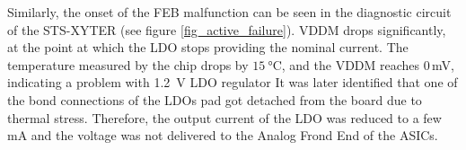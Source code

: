 Similarly, the onset of the \gls{FEB} malfunction can be seen in the diagnostic circuit of the STS-XYTER (see figure \ref{fig_active_failure}). VDDM drops significantly, at the point at which the \gls{LDO} stops providing the nominal current. The temperature measured by the chip drops by $\SI{15}{\celsius}$, and the VDDM reaches $0$\,mV, indicating a problem with \SI{1.2}{\volt} \gls{LDO} regulator It was later identified that one of the bond connections of the \glspl{LDO} pad got detached from the board due
to thermal stress. Therefore, the output current of the \gls{LDO} was reduced to a few mA and the voltage was not delivered to the Analog Frond End of the \glspl{ASIC}. 

\begin{table}[!h]
\centering
\caption{Detailed description of the \gls{LDO} failure with regard to the type and number of cycles}
\label{tab:setB}
\end{table}
